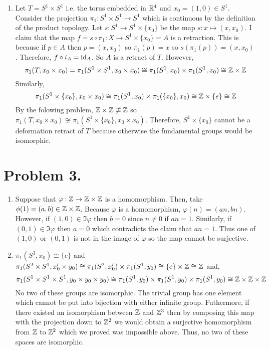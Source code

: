 \documentclass[12pt]{extarticle}
\begin{document}
\begin{enumerate}
\item Let $T = S^1 \times S^1$ i.e. the torus embedded in $\mathbb{R}^4$ and $x_0 = (1, 0) \in S^1$. Consider the projection $\pi_1 : S^1 \times S^1 \to S^1$ which is continuous by the definition of the product topology. Let $s : S^1 \to S^1 \times \{x_0\}$ be the map $s : x \mapsto (x, x_0)$. I claim that the map $f = s \circ \pi_1 : X \to S^1 \times \{x_0\} = A$ is a retraction. This is because if $p \in A$ then $p = (x, x_0)$ so $\pi_1(p) = x$ so $s(\pi_1(p)) = (x, x_0)$. Therefore, $f \circ i_A = \mathrm{id}_A$. So $A$ is a retract of $T$. However, 
\[\pi_1(T, x_0 \times x_0) = \pi_1(S^1 \times S^1, x_0 \times x_0) \cong \pi_1(S^1, x_0) \times \pi_1(S^1, x_0) \cong \mathbb{Z} \times \mathbb{Z}\]
Similarly, \[\pi_1(S^1 \times \{x_0 \}, x_0 \times x_0) \cong \pi_1(S^1, x_0) \times \pi_1(\{x_0\}, x_0) \cong \mathbb{Z} \times \{e\} \cong \mathbb{Z}\] 
By the folowing problem, $\mathbb{Z} \times \mathbb{Z} \not \cong \mathbb{Z}$ so $\pi_1(T, x_0 \times x_0) \not \cong \pi_1(S^1 \times \{x_0\}, x_0 \times x_0)$. Therefore, $S^1 \times \{x_0\}$ cannot be a deformation retract of $T$ because otherwise the fundamental groups would be isomorphic.     
\end{enumerate}    

\section*{Problem 3.}

\begin{enumerate}
\item Suppose that $\varphi : \mathbb{Z} \to \mathbb{Z} \times \mathbb{Z}$ is a homomorphism. Then, take $\phi(1) = (a, b) \in \mathbb{Z} \times \mathbb{Z}$. Because $\varphi$ is a homomorphism, $\varphi(n) = (an, bn)$. However, if $(1, 0) \in \Im{\varphi}$ then $b = 0$ since $n \neq 0$ if $an = 1$. Similarly, if $(0, 1) \in \Im{\varphi}$ then $a = 0$ which contradicts the claim that $an = 1$. Thus one of $(1,0)$ or $(0,1)$ is not in the image of $\varphi$ so the map cannot be surjective. 

\item $\pi_1(S^3, x_0) \cong \{e\}$ and $\pi_1(S^2 \times S^1, x_0' \times y_0) \cong \pi_1(S^2, x_0') \times \pi_1(S^1, y_0) \cong \{e \} \times \mathbb{Z} \cong \mathbb{Z}$ and, \[\pi_1(S^1 \times S^1 \times S^1, y_0 \times y_0 \times y_0) \cong \pi_1(S^1, y_0) \times \pi_1(S^1, y_0) \times \pi_1(S^1, y_0) \cong \mathbb{Z} \times \mathbb{Z} \times \mathbb{Z} \]
No two of these groups are isomorphic. The trivial group has one element which cannot be put into bijection with either infinite group. Futhermore, if there existed an isomorphism between $\mathbb{Z}$ and $\mathbb{Z}^3$ then by composing this map with the projection down to $\mathbb{Z}^2$ we would obtain a surjective homomorphism from $\mathbb{Z}$ to $\mathbb{Z}^2$ which we proved was impossible above. Thus, no two of these spaces are isomorphic.  
\end{enumerate}
\end{document}
